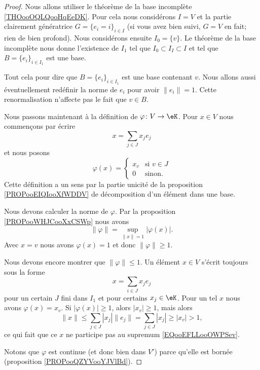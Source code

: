 \begin{proof}
	Nous allons utiliser le théorème de la base incomplète \ref{THOooOQLQooHqEeDK}. Pour cela nous considérons \( I=V\) et la partie clairement génératrice \( G=\{ e_i=i \}_{i\in I}\) (si vous avez bien suivi, \( G=V\) en fait; rien de bien profond). Nous considérons ensuite \( I_0=\{ v \}\). Le théorème de la base incomplète nous donne l'existence de \( I_1\) tel que \( I_0\subset I_I\subset I\) et tel que \( B=\{ e_i \}_{i\in I_1}\) est une base.

	Tout cela pour dire que \( B=\{ e_i \}_{i\in I_1}\) est une base contenant \( v\). Nous allons aussi éventuellement redéfinir la norme de \( e_i\) pour avoir \( \| e_i \|=1\). Cette renormalisation n'affecte pas le fait que \( v\in B\).

	Nous passons maintenant à la définition de \( \varphi\colon V\to \eK\). Pour \( x\in V\) nous commençons par écrire
	\begin{equation}
		x=\sum_{j\in J}x_je_j
	\end{equation}
	et nous posons
	\begin{equation}
		\varphi(x)=\begin{cases}
			x_v & \text{si } v\in J \\
			0   & \text{sinon. }
		\end{cases}
	\end{equation}
	Cette définition a un sens par la partie unicité de la proposition \ref{PROPooEIQIooXfWDDV} de décomposition d'un élément dans une base.

	Nous devons calculer la norme de \( \varphi\). Par la proposition \ref{PROPooWHJCooXxCSWp} nous avons
	\begin{equation}        \label{EQooEFLLooOWPSev}
		\| \varphi \|=\sup_{\| x \|=1}| \varphi(x) |.
	\end{equation}
	Avec \( x=v\) nous avons \( \varphi(x)=1\) et donc \( \| \varphi \|\geq 1\).

	Nous devons encore montrer que \( \| \varphi \|\leq 1\). Un élément \( x\in V\) s'écrit toujours sous la forme
	\begin{equation}
		x=\sum_{i\in J}x_je_j
	\end{equation}
	pour un certain \( J\) fini dans \( I_1\) et pour certains \( x_j\in \eK\). Pour un tel \( x\) nous avons \( \varphi(x)=x_v\). Si \( |\varphi(x)|\geq 1\), alors \( | x_v |\geq 1\), mais alors
	\begin{equation}
		\| x \|\leq \sum_{j\in J}| x_j |\| e_j \|=\sum_{j\in J}| x_j |\geq | x_v |>1,
	\end{equation}
	ce qui fait que ce \( x\) ne participe pas au supremum \eqref{EQooEFLLooOWPSev}.

	Notons que \( \varphi\) est continue (et donc bien dans \( V'\)) parce qu'elle est bornée (proposition \ref{PROPooQZYVooYJVlBd}).
\end{proof}

